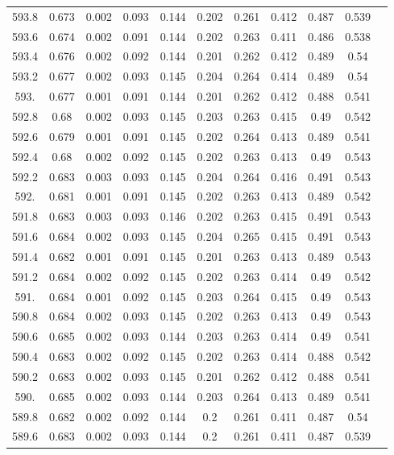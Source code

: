 \documentclass[12pt]{ctexart}
\numberwithin{equation}{section}
\begin{document}
\begin{longtable}{ccccccccccc}
593.8	&	0.673	&	0.002	&	0.093	&	0.144	&	0.202	&	0.261	&	0.412	&	0.487	&	0.539	\\
593.6	&	0.674	&	0.002	&	0.091	&	0.144	&	0.202	&	0.263	&	0.411	&	0.486	&	0.538	\\
593.4	&	0.676	&	0.002	&	0.092	&	0.144	&	0.201	&	0.262	&	0.412	&	0.489	&	0.54	\\
593.2	&	0.677	&	0.002	&	0.093	&	0.145	&	0.204	&	0.264	&	0.414	&	0.489	&	0.54	\\
593.	&	0.677	&	0.001	&	0.091	&	0.144	&	0.201	&	0.262	&	0.412	&	0.488	&	0.541	\\
592.8	&	0.68	&	0.002	&	0.093	&	0.145	&	0.203	&	0.263	&	0.415	&	0.49	&	0.542	\\
592.6	&	0.679	&	0.001	&	0.091	&	0.145	&	0.202	&	0.264	&	0.413	&	0.489	&	0.541	\\
592.4	&	0.68	&	0.002	&	0.092	&	0.145	&	0.202	&	0.263	&	0.413	&	0.49	&	0.543	\\
592.2	&	0.683	&	0.003	&	0.093	&	0.145	&	0.204	&	0.264	&	0.416	&	0.491	&	0.543	\\
592.	&	0.681	&	0.001	&	0.091	&	0.145	&	0.202	&	0.263	&	0.413	&	0.489	&	0.542	\\
591.8	&	0.683	&	0.003	&	0.093	&	0.146	&	0.202	&	0.263	&	0.415	&	0.491	&	0.543	\\
591.6	&	0.684	&	0.002	&	0.093	&	0.145	&	0.204	&	0.265	&	0.415	&	0.491	&	0.543	\\
591.4	&	0.682	&	0.001	&	0.091	&	0.145	&	0.201	&	0.263	&	0.413	&	0.489	&	0.543	\\
591.2	&	0.684	&	0.002	&	0.092	&	0.145	&	0.202	&	0.263	&	0.414	&	0.49	&	0.542	\\
591.	&	0.684	&	0.001	&	0.092	&	0.145	&	0.203	&	0.264	&	0.415	&	0.49	&	0.543	\\
590.8	&	0.684	&	0.002	&	0.093	&	0.145	&	0.202	&	0.263	&	0.413	&	0.49	&	0.543	\\
590.6	&	0.685	&	0.002	&	0.093	&	0.144	&	0.203	&	0.263	&	0.414	&	0.49	&	0.541	\\
590.4	&	0.683	&	0.002	&	0.092	&	0.145	&	0.202	&	0.263	&	0.414	&	0.488	&	0.542	\\
590.2	&	0.683	&	0.002	&	0.093	&	0.145	&	0.201	&	0.262	&	0.412	&	0.488	&	0.541	\\
590.	&	0.685	&	0.002	&	0.093	&	0.144	&	0.203	&	0.264	&	0.413	&	0.489	&	0.541	\\
589.8	&	0.682	&	0.002	&	0.092	&	0.144	&	0.2	&	0.261	&	0.411	&	0.487	&	0.54	\\
589.6	&	0.683	&	0.002	&	0.093	&	0.144	&	0.2	&	0.261	&	0.411	&	0.487	&	0.539	\\

\end{longtable}
\end{document}
